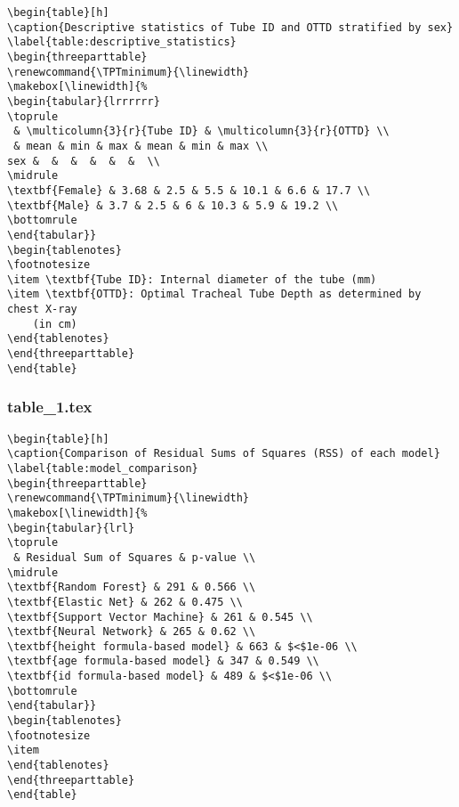 \documentclass[11pt]{article}
\begin{document}
\begin{Verbatim}[tabsize=4]
\begin{table}[h]
\caption{Descriptive statistics of Tube ID and OTTD stratified by sex}
\label{table:descriptive_statistics}
\begin{threeparttable}
\renewcommand{\TPTminimum}{\linewidth}
\makebox[\linewidth]{%
\begin{tabular}{lrrrrrr}
\toprule
 & \multicolumn{3}{r}{Tube ID} & \multicolumn{3}{r}{OTTD} \\
 & mean & min & max & mean & min & max \\
sex &  &  &  &  &  &  \\
\midrule
\textbf{Female} & 3.68 & 2.5 & 5.5 & 10.1 & 6.6 & 17.7 \\
\textbf{Male} & 3.7 & 2.5 & 6 & 10.3 & 5.9 & 19.2 \\
\bottomrule
\end{tabular}}
\begin{tablenotes}
\footnotesize
\item \textbf{Tube ID}: Internal diameter of the tube (mm)
\item \textbf{OTTD}: Optimal Tracheal Tube Depth as determined by chest X-ray
	(in cm)
\end{tablenotes}
\end{threeparttable}
\end{table}

\end{Verbatim}

\subsubsection*{table\_1.tex}

\begin{Verbatim}[tabsize=4]
\begin{table}[h]
\caption{Comparison of Residual Sums of Squares (RSS) of each model}
\label{table:model_comparison}
\begin{threeparttable}
\renewcommand{\TPTminimum}{\linewidth}
\makebox[\linewidth]{%
\begin{tabular}{lrl}
\toprule
 & Residual Sum of Squares & p-value \\
\midrule
\textbf{Random Forest} & 291 & 0.566 \\
\textbf{Elastic Net} & 262 & 0.475 \\
\textbf{Support Vector Machine} & 261 & 0.545 \\
\textbf{Neural Network} & 265 & 0.62 \\
\textbf{height formula-based model} & 663 & $<$1e-06 \\
\textbf{age formula-based model} & 347 & 0.549 \\
\textbf{id formula-based model} & 489 & $<$1e-06 \\
\bottomrule
\end{tabular}}
\begin{tablenotes}
\footnotesize
\item
\end{tablenotes}
\end{threeparttable}
\end{table}

\end{Verbatim}
\end{document}
